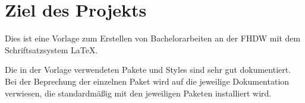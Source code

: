 \section{Ziel des Projekts}

Dies ist eine Vorlage zum Erstellen von Bachelorarbeiten an der FHDW mit dem
Schriftsatzsystem {\LaTeX}.

Die in der Vorlage verwendeten Pakete und Styles sind sehr gut dokumentiert. Bei
der Beprechung der einzelnen Paket wird auf die jeweilige Dokumentation verwiesen, die standardmäßig mit den jeweiligen Paketen installiert wird.
